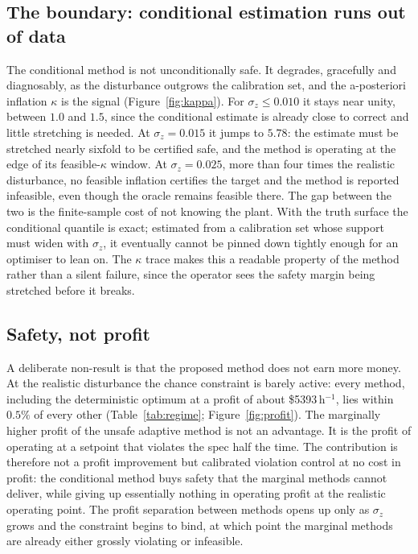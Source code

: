 \documentclass[review,times]{elsarticle}
\begin{document}
\subsection{The boundary: conditional estimation runs out of data}
\label{sec:results-boundary}

The conditional method is not unconditionally safe. It degrades, gracefully and diagnosably, as
the disturbance outgrows the calibration set, and the a-posteriori inflation $\kappa$ is the
signal (Figure~\ref{fig:kappa}). For $\sigma_z\le0.010$ it stays near unity, between $1.0$ and
$1.5$, since the conditional estimate is already close to correct and little stretching is
needed. At $\sigma_z=0.015$ it jumps to $5.78$: the estimate must be stretched nearly sixfold to
be certified safe, and the method is operating at the edge of its feasible-$\kappa$ window. At
$\sigma_z=0.025$, more than four times the realistic disturbance, no feasible inflation certifies
the target and the method is reported infeasible, even though the oracle remains feasible there.
The gap between the two is the finite-sample cost of not knowing the plant. With the truth
surface the conditional quantile is exact; estimated from a calibration set whose support must
widen with $\sigma_z$, it eventually cannot be pinned down tightly enough for an optimiser to
lean on. The $\kappa$ trace makes this a readable property of the method rather than a silent
failure, since the operator sees the safety margin being stretched before it breaks.

\subsection{Safety, not profit}
\label{sec:results-profit}

A deliberate non-result is that the proposed method does not earn more money. At the realistic
disturbance the chance constraint is barely active: every method, including the deterministic
optimum at a profit of about \$5393\,h$^{-1}$, lies within $0.5\%$ of every other
(Table~\ref{tab:regime}; Figure~\ref{fig:profit}). The marginally higher profit of the unsafe
adaptive method is not an advantage. It is the profit of operating at a setpoint that violates
the spec half the time. The contribution is therefore not a profit improvement but calibrated
violation control at no cost in profit: the conditional method buys safety that the marginal
methods cannot deliver, while giving up essentially nothing in operating profit at the realistic
operating point. The profit separation between methods opens up only as $\sigma_z$ grows and the
constraint begins to bind, at which point the marginal methods are already either grossly
violating or infeasible.
\end{document}

